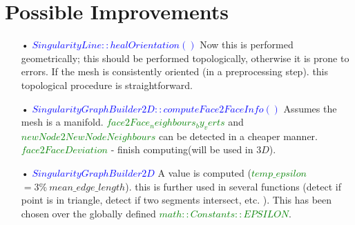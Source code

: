 \documentclass[a4paper]{report}
\begin{document}
{
}






 \newpage
\section{Possible Improvements}
{
\begin{itemize}
\item[•] \textcolor{blue}{$SingularityLine::healOrientation()$}
\newline
Now this is performed geometrically; this should be performed topologically, otherwise it is prone to errors. If the mesh is consistently oriented (in a preprocessing step). this topological procedure is straightforward.
\item[•] \textcolor{blue}{$SingularityGraphBuilder2D::computeFace2FaceInfo()$}
\newline
Assumes the mesh is a manifold.
\newline
\textcolor{green}{$face2Face_neighbours_by_verts$} and \textcolor{green}{$newNode2NewNodeNeighbours$} can be detected in a cheaper manner.
\newline
\textcolor{green}{$face2FaceDeviation$} - finish computing(will be used in $3D$).
\newline
\item[•] \textcolor{blue}{$SingularityGraphBuilder2D$}
\newline
A value is computed (\textcolor{green}{$temp\_epsilon$} $ = 3\% \ mean\_edge\_length$). this is further used in several functions (detect if point is in triangle, detect if two segments intersect, etc. ). This has been chosen over the globally defined \textcolor{green}{$math::Constants::EPSILON$}.
\end{itemize}


}
\end{document}

